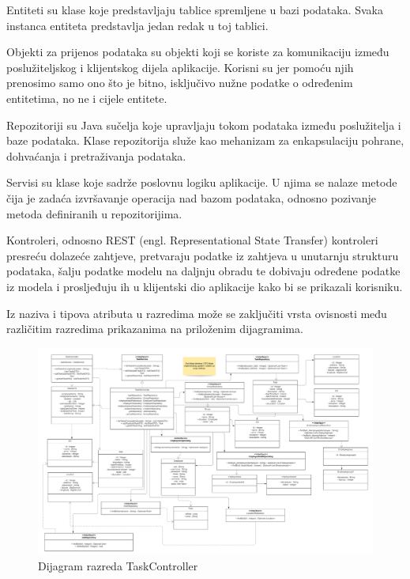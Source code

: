             Entiteti su klase koje predstavljaju tablice spremljene u bazi podataka. Svaka instanca entiteta predstavlja jedan redak u toj tablici.  

            Objekti za prijenos podataka su objekti koji se koriste za komunikaciju između poslužiteljskog i klijentskog dijela aplikacije. Korisni su jer pomoću njih prenosimo samo ono što je bitno, isključivo nužne podatke o određenim entitetima, no ne i cijele entitete. 
            
            Repozitoriji su Java sučelja koje upravljaju tokom podataka između poslužitelja i baze podataka. Klase repozitorija služe kao mehanizam za enkapsulaciju pohrane, dohvaćanja i pretraživanja podataka.  
            
            Servisi su klase koje sadrže poslovnu logiku aplikacije. U njima se nalaze metode čija je zadaća izvršavanje operacija nad bazom podataka, odnosno pozivanje metoda definiranih u repozitorijima. 
            
            Kontroleri, odnosno REST (engl. Representational State Transfer) kontroleri presreću dolazeće zahtjeve, pretvaraju podatke iz zahtjeva u unutarnju strukturu podataka, šalju podatke modelu na daljnju obradu te dobivaju određene podatke iz modela i prosljeđuju ih u klijentski dio aplikacije kako bi se prikazali korisniku.  
            
            Iz naziva i tipova atributa u razredima može se zaključiti vrsta ovisnosti među različitim razredima prikazanima na priloženim dijagramima. 
			
			
			
			
			\begin{figure}[H]
					\centering
					\includegraphics[width=\textwidth]{slike/fixTaskController.jpg}
					\caption{Dijagram razreda TaskController}
				\end{figure}
			
